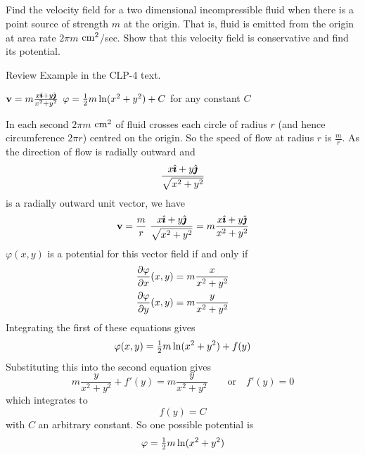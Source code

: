 \subsection*{\Application}

\begin{question}
Find the velocity field for a two dimensional incompressible
fluid when there is a point source of strength $m$ at the origin. That is, fluid
is emitted from the origin at area rate $2\pi m$ ${\rm cm}^2$/sec.
Show that this velocity field is conservative and find its potential.
\end{question}

\begin{hint}
Review Example  in the CLP-4 text.
\end{hint}

\begin{answer}
$\mathbf{v}=m\frac{x\hat{\pmb{\imath}}+y\hat{\pmb{\jmath}}}{x^2+y^2}$\qquad
$\varphi=\tfrac{1}{2} m\ln(x^2+y^2)+C$ for any constant $C$
\end{answer}

\begin{solution}
 In each second $2\pi m$ ${\rm cm}^2$ of fluid crosses each
circle of radius $r$ (and hence circumference $2\pi r$) centred on the
origin. So the speed of flow at radius $r$ is $\frac{m}{r}$. As the direction
of flow is radially outward and
\begin{align*}
   \frac{x\hat{\pmb{\imath}}+y\hat{\pmb{\jmath}}}{\sqrt{x^2+y^2}}
\end{align*}
is a radially outward unit vector, we have
\begin{align*}
   \mathbf{v}=\frac{m}{r}\  \frac{x\hat{\pmb{\imath}}+y\hat{\pmb{\jmath}}}{\sqrt{x^2+y^2}}
     =m\frac{x\hat{\pmb{\imath}}+y\hat{\pmb{\jmath}}}{x^2+y^2}
\end{align*}
$\varphi(x,y)$ is a potential for this vector field if and only if
\begin{align*}
\pdiff{\varphi}{x}(x,y) &= m\frac{x}{x^2+y^2} \\
\pdiff{\varphi}{y}(x,y) &= m\frac{y}{x^2+y^2} 
\end{align*}
Integrating the first of these equations gives
\begin{equation*}
\varphi(x,y) = \tfrac{1}{2} m\ln(x^2+y^2) + f(y)
\end{equation*}
Substituting this into the second equation gives 
\begin{equation*}
m\frac{y}{x^2+y^2} + f'(y) 
   = m\frac{y}{x^2+y^2}\qquad\text{or}\quad
f'(y) = 0
\end{equation*}
which integrates to
\begin{equation*}
f(y) = C
\end{equation*}
with $C$ an arbitrary constant. So one possible potential is
\begin{equation*}
\varphi=\tfrac{1}{2} m\ln(x^2+y^2)
\end{equation*}

\end{solution}


